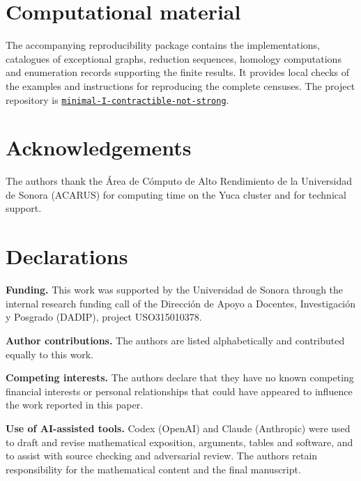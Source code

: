\section*{Computational material}
The accompanying reproducibility package contains the implementations,
catalogues of exceptional graphs, reduction sequences, homology computations
and enumeration records supporting the finite results. It provides
local checks of the examples and instructions for reproducing the
complete censuses. The project repository is
\href{https://github.com/Geometric-and-Combinatorial-Structures/minimal-I-contractible-not-strong}{\texttt{minimal-I-contractible-not-strong}}.

\section*{Acknowledgements}
The authors thank the \'Area de C\'omputo de Alto Rendimiento de la
Universidad de Sonora (ACARUS) for computing time on the Yuca cluster
and for technical support.

\section*{Declarations}
\noindent\textbf{Funding.}
This work was supported by the Universidad de Sonora through the internal
research funding call of the Direcci\'on de Apoyo a Docentes,
Investigaci\'on y Posgrado (DADIP), project USO315010378.

\noindent\textbf{Author contributions.}
The authors are listed alphabetically and contributed equally to this work.

\noindent\textbf{Competing interests.}
The authors declare that they have no known competing financial interests
or personal relationships that could have appeared to influence the work
reported in this paper.

\noindent\textbf{Use of AI-assisted tools.}
Codex (OpenAI) and Claude (Anthropic) were used to draft and revise
mathematical exposition, arguments, tables and software, and to assist
with source checking and adversarial review. The authors retain
responsibility for the mathematical content and the final manuscript.
